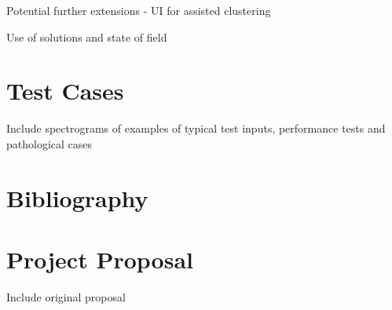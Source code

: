 \documentclass[10pt,twoside,a4paper]{report}
\begin{document}
Potential further extensions - UI for assisted clustering

Use of solutions and state of field

\appendix

\chapter{Test Cases}

Include spectrograms of examples of typical test inputs, performance tests and pathological cases

\chapter{Bibliography}





\chapter{Project Proposal}

Include original proposal
\end{document}
